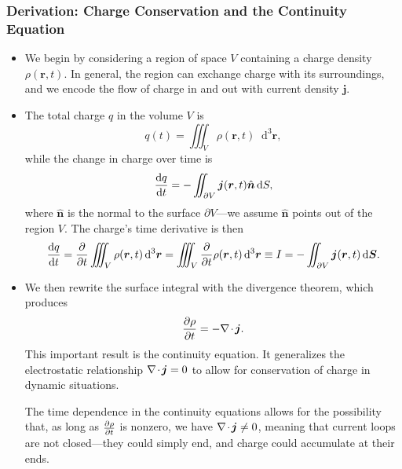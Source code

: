 \documentclass[11pt, a4paper]{article}
\newcommand{\diff}{\mathop{}\!\mathrm{d}} %
\newcommand{\dr}{\diff^{3} \r}  %
\renewcommand{\vec}[1]{\bm{#1}} %
\newcommand{\uvec}[1]{\hat{\vec{#1}}} %
\renewcommand{\r}{\vec{r}}
\renewcommand{\j}{\vec{j}}  %
\renewcommand{\div}{\nabla \mspace{-2mu} \cdot \mspace{-2mu}}
\begin{document}
\subsubsection{Derivation: Charge Conservation and the Continuity Equation}
\begin{itemize}
	\item We begin by considering a region of space $ V $ containing a charge density $ \rho(\r, t) $. In general, the region can exchange charge with its surroundings, and we encode the flow of charge in and out with current density $ \j $.
	
	\item The total charge $ q $ in the volume $ V $ is
	\begin{equation*}
		q(t) = \iiint_{V}\rho(\r, t)\dr,
	\end{equation*}
	while the change in charge over time is
	\begin{equation*}
		\dv{q}{t} = - \iint_{\partial V} \j(\r, t)\uvec{n}\diff S,
	\end{equation*}
	where $ \uvec{n} $ is the normal to the surface $ \partial V $---we assume $ \uvec{n} $ points out of the region $ V $. The charge's time derivative is then
	\begin{equation*}
		\dv{q}{t} = \pdv{t}\iiint_{V} \rho(\r, t)\dr = \iiint_{V} \pdv{t}\rho(\r, t)\dr \equiv I = - \iint_{\partial V} \j(\r, t)\diff \vec{S}.
	\end{equation*}

	\item We then rewrite the surface integral with the divergence theorem, which produces
	\begin{equation*}
		\pdv{\rho}{t} = - \div \j.
	\end{equation*}
	This important result is the continuity equation. It generalizes the electrostatic relationship $ \div \j = 0 $ to allow for conservation of charge in dynamic situations.
	
    The time dependence in the continuity equations allows for the possibility that, as long as $ \pdv{\rho}{t} $ is nonzero, we have $ \div \j \neq 0 $, meaning that current loops are not closed---they could simply end, and charge could accumulate at their ends. 
\end{itemize}
\end{document}
